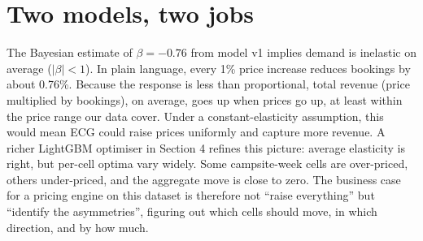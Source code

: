 \documentclass[11pt,a4paper]{article}
\begin{document}
\begin{center}
\end{center}

\section{Two models, two jobs}

The Bayesian estimate of $\beta = -0.76$ from model v1 implies demand is inelastic on average ($|\beta| < 1$). In plain language, every 1\% price increase reduces bookings by about 0.76\%. Because the response is less than proportional, total revenue (price multiplied by bookings), on average, goes up when prices go up, at least within the price range our data cover. Under a constant-elasticity assumption, this would mean ECG could raise prices uniformly and capture more revenue. A richer LightGBM optimiser in Section 4 refines this picture: average elasticity is right, but per-cell optima vary widely. Some campsite-week cells are over-priced, others under-priced, and the aggregate move is close to zero. The business case for a pricing engine on this dataset is therefore not ``raise everything'' but ``identify the asymmetries'', figuring out which cells should move, in which direction, and by how much.
\end{document}
